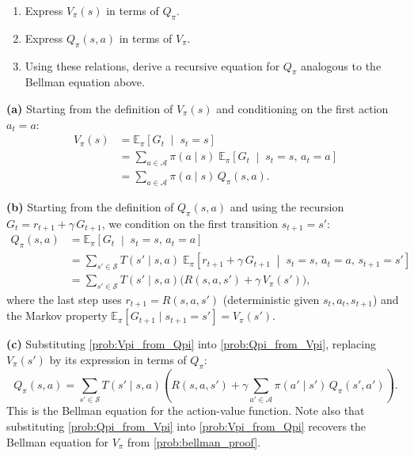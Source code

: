 \documentclass[11pt]{article}
\newcommand{\cS}{\mathcal{S}}
\newcommand{\cA}{\mathcal{A}}
\begin{document}
\begin{exercise}
\label{prob:q_function}
\begin{enumerate}
\item\label{prob:Vpi_from_Qpi} Express $V_\pi(s)$ in terms of $Q_\pi$.
\item\label{prob:Qpi_from_Vpi} Express $Q_\pi(s,a)$ in terms of $V_\pi$.
\item\label{prob:bellman_Q} Using these relations, derive a recursive equation for $Q_\pi$ analogous to the Bellman equation above.
\end{enumerate}
\end{exercise}

\begin{solution}
\textbf{(a)} Starting from the definition of $V_\pi(s)$ and conditioning on the first action $a_t = a$:
\begin{align*}
V_\pi(s) &= \mathbb{E}_\pi\!\left[G_t \;\middle|\; s_t = s\right] \\
&= \sum_{a \in \cA} \pi(a \mid s)\; \mathbb{E}_\pi\!\left[G_t \;\middle|\; s_t = s,\, a_t = a\right] \\
&= \sum_{a \in \cA} \pi(a \mid s)\, Q_\pi(s, a).
\end{align*}

\textbf{(b)} Starting from the definition of $Q_\pi(s,a)$ and using the recursion $G_t = r_{t+1} + \gamma\, G_{t+1}$, we condition on the first transition $s_{t+1} = s'$:
\begin{align*}
Q_\pi(s,a) &= \mathbb{E}_\pi\!\left[G_t \;\middle|\; s_t = s,\, a_t = a\right] \\
&= \sum_{s' \in \cS} T(s' \mid s, a)\; \mathbb{E}_\pi\!\left[r_{t+1} + \gamma\, G_{t+1} \;\middle|\; s_t = s,\, a_t = a,\, s_{t+1} = s'\right] \\
&= \sum_{s' \in \cS} T(s' \mid s, a)\bigl(R(s, a, s') + \gamma\, V_\pi(s')\bigr),
\end{align*}
where the last step uses $r_{t+1} = R(s,a,s')$ (deterministic given $s_t, a_t, s_{t+1}$) and the Markov property $\mathbb{E}_\pi[G_{t+1} \mid s_{t+1} = s'] = V_\pi(s')$.

\textbf{(c)} Substituting \cref{prob:Vpi_from_Qpi} into \cref{prob:Qpi_from_Vpi}, replacing $V_\pi(s')$ by its expression in terms of $Q_\pi$:
$$
Q_\pi(s, a) = \sum_{s' \in \cS} T(s' \mid s, a)\!\left(R(s, a, s') + \gamma \sum_{a' \in \cA} \pi(a' \mid s')\, Q_\pi(s', a')\right).
$$
This is the Bellman equation for the action-value function. Note also that substituting \cref{prob:Qpi_from_Vpi} into \cref{prob:Vpi_from_Qpi} recovers the Bellman equation for $V_\pi$ from \cref{prob:bellman_proof}.
\end{solution}
\end{document}

